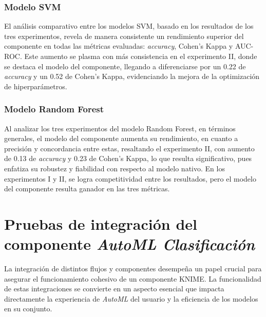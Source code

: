 \subsubsection*{Modelo SVM}
El análisis comparativo entre los modelos SVM, basado en los resultados de los tres experimentos, revela de manera consistente un rendimiento superior del componente en todas las métricas evaluadas: \textit{accuracy}, Cohen's Kappa y AUC-ROC. Este aumento se plasma con más consistencia en el experimento II, donde se destaca el modelo del componente, llegando a diferenciarse por un 0.22 de \textit{accuracy} y un 0.52 de Cohen's Kappa, evidenciando la mejora de la optimización de hiperparámetros.

\subsubsection*{Modelo Random Forest}
Al analizar los tres experimentos del modelo Random Forest, en términos generales, el modelo del componente aumenta su rendimiento, en cuanto a precisión y concordancia entre estas, resaltando el experimento II, con aumento de 0.13 de \textit{accuracy} y 0.23 de Cohen's Kappa, lo que resulta significativo, pues enfatiza su robustez y fiabilidad con respecto al modelo nativo. En los experimentos I y II, se logra competitividad entre los resultados, pero el modelo del componente resulta ganador en las tres métricas.


\section{Pruebas de integración del componente \textit{AutoML Clasificación}}

La integración de distintos flujos y componentes desempeña un papel crucial para asegurar el funcionamiento cohesivo de un componente KNIME. La funcionalidad de estas integraciones se convierte en un aspecto esencial que impacta directamente la experiencia de \textit{AutoML} del usuario y la eficiencia de los modelos en su conjunto. 

